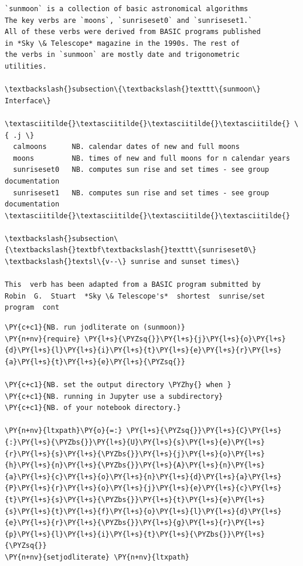     \begin{Verbatim}[commandchars=\\\{\}]
﻿`sunmoon` is a collection of basic astronomical algorithms
The key verbs are `moons`, `sunriseset0` and `sunriseset1.`
All of these verbs were derived from BASIC programs published
in *Sky \& Telescope* magazine in the 1990s. The rest of
the verbs in `sunmoon` are mostly date and trigonometric
utilities.

\textbackslash{}subsection\{\textbackslash{}texttt\{sunmoon\} Interface\}

\textasciitilde{}\textasciitilde{}\textasciitilde{}\textasciitilde{} \{ .j \}
  calmoons      NB. calendar dates of new and full moons
  moons         NB. times of new and full moons for n calendar years
  sunriseset0   NB. computes sun rise and set times - see group documentation
  sunriseset1   NB. computes sun rise and set times - see group documentation
\textasciitilde{}\textasciitilde{}\textasciitilde{}\textasciitilde{}

\textbackslash{}subsection\{\textbackslash{}textbf\textbackslash{}texttt\{sunriseset0\} \textbackslash{}textsl\{v--\} sunrise and sunset times\}

This  verb has been adapted from a BASIC program submitted by
Robin  G.  Stuart  *Sky \& Telescope's*  shortest  sunrise/set
program  cont
    \end{Verbatim}

    \begin{tcolorbox}[breakable, size=fbox, boxrule=1pt, pad at break*=1mm,colback=cellbackground, colframe=cellborder]
\begin{Verbatim}[commandchars=\\\{\}]
\PY{c+c1}{NB. run jodliterate on (sunmoon)}
\PY{n+nv}{require} \PY{l+s}{\PYZsq{}}\PY{l+s}{j}\PY{l+s}{o}\PY{l+s}{d}\PY{l+s}{l}\PY{l+s}{i}\PY{l+s}{t}\PY{l+s}{e}\PY{l+s}{r}\PY{l+s}{a}\PY{l+s}{t}\PY{l+s}{e}\PY{l+s}{\PYZsq{}}

\PY{c+c1}{NB. set the output directory \PYZhy{} when }
\PY{c+c1}{NB. running in Jupyter use a subdirectory}
\PY{c+c1}{NB. of your notebook directory.}

\PY{n+nv}{ltxpath}\PY{o}{=:} \PY{l+s}{\PYZsq{}}\PY{l+s}{C}\PY{l+s}{:}\PY{l+s}{\PYZbs{}}\PY{l+s}{U}\PY{l+s}{s}\PY{l+s}{e}\PY{l+s}{r}\PY{l+s}{s}\PY{l+s}{\PYZbs{}}\PY{l+s}{j}\PY{l+s}{o}\PY{l+s}{h}\PY{l+s}{n}\PY{l+s}{\PYZbs{}}\PY{l+s}{A}\PY{l+s}{n}\PY{l+s}{a}\PY{l+s}{c}\PY{l+s}{o}\PY{l+s}{n}\PY{l+s}{d}\PY{l+s}{a}\PY{l+s}{P}\PY{l+s}{r}\PY{l+s}{o}\PY{l+s}{j}\PY{l+s}{e}\PY{l+s}{c}\PY{l+s}{t}\PY{l+s}{s}\PY{l+s}{\PYZbs{}}\PY{l+s}{t}\PY{l+s}{e}\PY{l+s}{s}\PY{l+s}{t}\PY{l+s}{f}\PY{l+s}{o}\PY{l+s}{l}\PY{l+s}{d}\PY{l+s}{e}\PY{l+s}{r}\PY{l+s}{\PYZbs{}}\PY{l+s}{g}\PY{l+s}{r}\PY{l+s}{p}\PY{l+s}{l}\PY{l+s}{i}\PY{l+s}{t}\PY{l+s}{\PYZbs{}}\PY{l+s}{\PYZsq{}} 
\PY{n+nv}{setjodliterate} \PY{n+nv}{ltxpath}
\end{Verbatim}
\end{tcolorbox}

